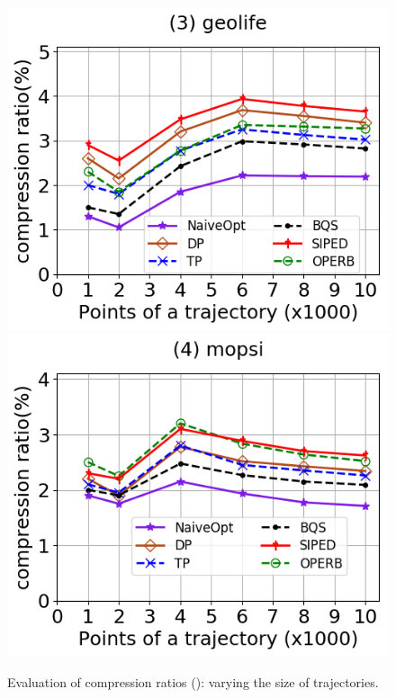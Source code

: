 \begin{figure}[tb!]
	\includegraphics[scale=0.315]{Figures/Exp-PED-CR-size-geolife.png}	\hspace{1ex}
	\includegraphics[scale=0.315]{Figures/Exp-PED-CR-size-mopsi.png}		
	\vspace{-3ex}
	\caption{\small Evaluation of compression ratios (\ped): varying the size of
    trajectories.}
  \label{fig:cr-ped-size}
	\vspace{-2ex}
\end{figure}

